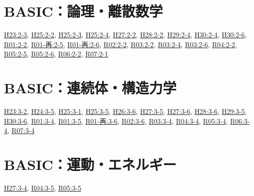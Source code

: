 \section{BASIC：論理・離散数学}
\hyperref[q:h23-reg-basic-2-3]{H23:2-3}, \hyperref[q:h25-reg-basic-2-2]{H25:2-2}, \hyperref[q:h25-reg-basic-2-3]{H25:2-3}, \hyperref[q:h25-reg-basic-2-4]{H25:2-4}, \hyperref[q:h27-reg-basic-2-2]{H27:2-2}, \hyperref[q:h28-reg-basic-2-2]{H28:2-2}, \hyperref[q:h29-reg-basic-2-4]{H29:2-4}, \hyperref[q:h30-reg-basic-2-4]{H30:2-4}, \hyperref[q:h30-reg-basic-2-6]{H30:2-6}, \hyperref[q:r01-reg-basic-2-2]{R01:2-2}, \hyperref[q:r01-ret-basic-2-5]{R01-再:2-5}, \hyperref[q:r01-ret-basic-2-6]{R01-再:2-6}, \hyperref[q:r02-reg-basic-2-2]{R02:2-2}, \hyperref[q:r03-reg-basic-2-2]{R03:2-2}, \hyperref[q:r03-reg-basic-2-4]{R03:2-4}, \hyperref[q:r03-reg-basic-2-6]{R03:2-6}, \hyperref[q:r04-reg-basic-2-2]{R04:2-2}, \hyperref[q:r05-reg-basic-2-5]{R05:2-5}, \hyperref[q:r05-reg-basic-2-6]{R05:2-6}, \hyperref[q:r06-reg-basic-2-2]{R06:2-2}, \hyperref[q:r07-reg-basic-2-1]{R07:2-1}
\section{BASIC：連続体・構造力学}
\hyperref[q:h23-reg-basic-3-2]{H23:3-2}, \hyperref[q:h24-reg-basic-3-5]{H24:3-5}, \hyperref[q:h25-reg-basic-3-1]{H25:3-1}, \hyperref[q:h25-reg-basic-3-5]{H25:3-5}, \hyperref[q:h26-reg-basic-3-6]{H26:3-6}, \hyperref[q:h27-reg-basic-3-5]{H27:3-5}, \hyperref[q:h27-reg-basic-3-6]{H27:3-6}, \hyperref[q:h28-reg-basic-3-6]{H28:3-6}, \hyperref[q:h29-reg-basic-3-5]{H29:3-5}, \hyperref[q:h30-reg-basic-3-6]{H30:3-6}, \hyperref[q:r01-reg-basic-3-4]{R01:3-4}, \hyperref[q:r01-reg-basic-3-5]{R01:3-5}, \hyperref[q:r01-ret-basic-3-6]{R01-再:3-6}, \hyperref[q:r02-reg-basic-3-6]{R02:3-6}, \hyperref[q:r03-reg-basic-3-4]{R03:3-4}, \hyperref[q:r04-reg-basic-3-4]{R04:3-4}, \hyperref[q:r05-reg-basic-3-4]{R05:3-4}, \hyperref[q:r06-reg-basic-3-4]{R06:3-4}, \hyperref[q:r07-reg-basic-3-4]{R07:3-4}
\section{BASIC：運動・エネルギー}
\hyperref[q:h27-reg-basic-3-4]{H27:3-4}, \hyperref[q:r04-reg-basic-3-5]{R04:3-5}, \hyperref[q:r05-reg-basic-3-5]{R05:3-5}
